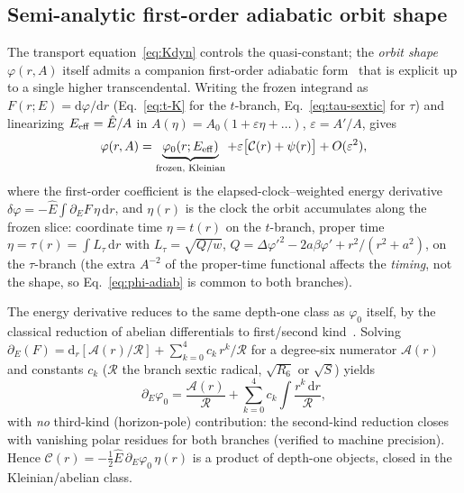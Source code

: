 \documentclass[
    aps, prd, twocolumn, superscriptaddress,
    showpacs, nofootinbib, floatfix
]{revtex4-2}
\newcommand{\Ehat}{\hat E}
\newcommand{\dd}{\mathrm{d}}
\begin{document}
\subsection{Semi-analytic first-order adiabatic orbit shape}
\label{sec:adiabatic}
The transport equation~\eqref{eq:Kdyn} controls the quasi-constant; the
\emph{orbit shape} $\varphi(r,A)$ itself admits a companion first-order adiabatic
form~\cite{BornFock1928,BenderOrszag1999} that is explicit up to a single higher
transcendental. Writing the frozen integrand as
$F(r;E)=\dd\varphi/\dd r$ (Eq.~\eqref{eq:t-K} for the $t$-branch,
Eq.~\eqref{eq:tau-sextic} for $\tau$) and linearizing $E_{\rm eff}=\Ehat/A$ in
$A(\eta)=A_0(1+\varepsilon\eta+\dots)$, $\varepsilon=A'/A$, gives
\begin{equation}
    \varphi(r,A)=\underbrace{\varphi_0(r;E_{\rm eff})}_{\text{frozen, Kleinian}}
    +\varepsilon\big[\mathcal{C}(r)+\psi(r)\big]+O(\varepsilon^2),
    \label{eq:phi-adiab}
\end{equation}
where the first-order coefficient is the elapsed-clock--weighted energy
derivative $\delta\varphi=-\Ehat\!\int\!\partial_E F\,\eta\,\dd r$, and $\eta(r)$
is the clock the orbit accumulates along the frozen slice: coordinate time
$\eta=t(r)$ on the $t$-branch, proper time $\eta=\tau(r)=\int\!L_\tau\,\dd r$ with
$L_\tau=\sqrt{Q/w}$, $Q=\Delta\varphi'^2-2a\beta\varphi'+r^2/(r^2+a^2)$, on the
$\tau$-branch (the extra $A^{-2}$ of the proper-time functional affects the
\emph{timing}, not the shape, so Eq.~\eqref{eq:phi-adiab} is common to both
branches).

The energy derivative reduces to the same depth-one class as $\varphi_0$ itself, by
the classical reduction of abelian differentials to first/second
kind~\cite{BakerAbelian1897,GriffithsHarris1978}.
Solving $\partial_E(F)=\dd_r[\mathcal{A}(r)/\mathcal{R}]
+\sum_{k=0}^{4}c_k\,r^k/\mathcal{R}$ for a degree-six numerator $\mathcal{A}(r)$
and constants $c_k$ ($\mathcal{R}$ the branch sextic radical, $\sqrt{R_6}$ or
$\sqrt{S}$) yields
\begin{equation}
    \partial_E\varphi_0=\frac{\mathcal{A}(r)}{\mathcal{R}}
    +\sum_{k=0}^{4}c_k\!\int\!\frac{r^k\,\dd r}{\mathcal{R}},
    \label{eq:dEphi0}
\end{equation}
with \emph{no} third-kind (horizon-pole) contribution: the second-kind reduction
closes with vanishing polar residues for both branches (verified to machine
precision). Hence $\mathcal{C}(r)=-\tfrac12\Ehat\,\partial_E\varphi_0\,\eta(r)$ is
a product of depth-one objects, closed in the Kleinian/abelian class.
\end{document}
